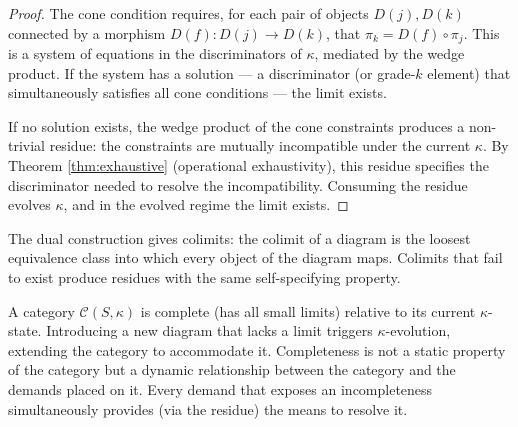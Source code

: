 \begin{proof}
The cone condition requires, for each pair of objects
$D(j), D(k)$ connected by a morphism $D(f): D(j) \to D(k)$,
that $\pi_k = D(f) \circ \pi_j$. This is a system of
equations in the discriminators of $\kappa$, mediated by
the wedge product. If the system has a solution --- a
discriminator (or grade-$k$ element) that simultaneously
satisfies all cone conditions --- the limit exists.

If no solution exists, the wedge product of the cone
constraints produces a non-trivial residue: the
constraints are mutually incompatible under the current
$\kappa$. By Theorem \ref{thm:exhaustive} (operational
exhaustivity), this residue specifies the discriminator
needed to resolve the incompatibility. Consuming the
residue evolves $\kappa$, and in the evolved regime
the limit exists.
\end{proof}

\begin{remark}
The dual construction gives colimits: the colimit of a
diagram is the loosest equivalence class into which every
object of the diagram maps. Colimits that fail to exist
produce residues with the same self-specifying property.
\end{remark}

\begin{remark}
A category $\mathcal{C}(S,\kappa)$ is complete (has all
small limits) relative to its current $\kappa$-state.
Introducing a new diagram that lacks a limit triggers
$\kappa$-evolution, extending the category to accommodate
it. Completeness is not a static property of the category
but a dynamic relationship between the category and the
demands placed on it. Every demand that exposes an
incompleteness simultaneously provides (via the residue)
the means to resolve it.
\end{remark}

